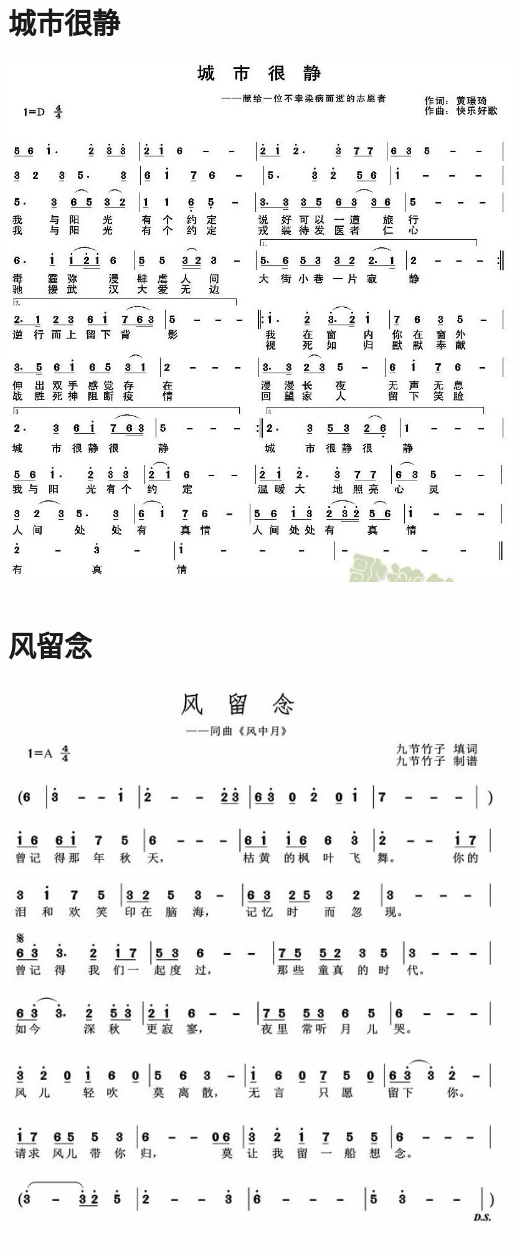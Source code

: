 \documentclass[cn,pad,chinese,chinesefont=nofont,math=newtx]{elegantbook}
\begin{document}
\section{城市很静}
    \includegraphics[width=\textwidth]{dongxiao/20200402-城市很静} 
\section{风留念}
    \includegraphics[width=\textwidth]{dongxiao/20200323风留念.jpg}
\end{document}
